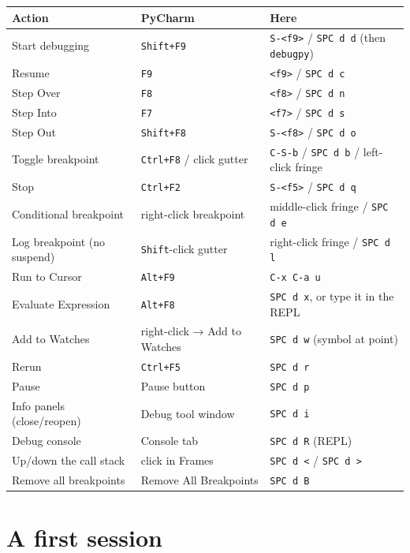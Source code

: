\documentclass[11pt]{article}
\begin{document}
\begin{center}
\begin{tabular}{lll}
Action & PyCharm & Here\\
\hline
Start debugging & \texttt{Shift+F9} & \texttt{S-<f9>} / \texttt{SPC d d} (then \texttt{debugpy})\\
Resume & \texttt{F9} & \texttt{<f9>} / \texttt{SPC d c}\\
Step Over & \texttt{F8} & \texttt{<f8>} / \texttt{SPC d n}\\
Step Into & \texttt{F7} & \texttt{<f7>} / \texttt{SPC d s}\\
Step Out & \texttt{Shift+F8} & \texttt{S-<f8>} / \texttt{SPC d o}\\
Toggle breakpoint & \texttt{Ctrl+F8} / click gutter & \texttt{C-S-b} / \texttt{SPC d b} / left-click fringe\\
Stop & \texttt{Ctrl+F2} & \texttt{S-<f5>} / \texttt{SPC d q}\\
Conditional breakpoint & right-click breakpoint & middle-click fringe / \texttt{SPC d e}\\
Log breakpoint (no suspend) & \texttt{Shift}-click gutter & right-click fringe / \texttt{SPC d l}\\
Run to Cursor & \texttt{Alt+F9} & \texttt{C-x C-a u}\\
Evaluate Expression & \texttt{Alt+F8} & \texttt{SPC d x}, or type it in the REPL\\
Add to Watches & right-click → Add to Watches & \texttt{SPC d w} (symbol at point)\\
Rerun & \texttt{Ctrl+F5} & \texttt{SPC d r}\\
Pause & Pause button & \texttt{SPC d p}\\
Info panels (close/reopen) & Debug tool window & \texttt{SPC d i}\\
Debug console & Console tab & \texttt{SPC d R} (REPL)\\
Up/down the call stack & click in Frames & \texttt{SPC d <} / \texttt{SPC d >}\\
Remove all breakpoints & Remove All Breakpoints & \texttt{SPC d B}\\
\end{tabular}
\end{center}
\section{A first session}
\label{sec:org6a4b14f}
\end{document}

